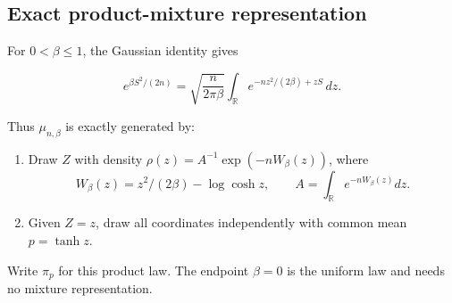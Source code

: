 \subsection{Exact product-mixture representation}\label{cw:exact-product-mixture-representation}

For \(0<\beta\le1\), the Gaussian identity gives

\[
e^{\beta S^2/(2n)}=\sqrt{\frac n{2\pi\beta}}\int_{\mathbb R}
e^{-nz^2/(2\beta)+zS}\,dz.
\]

Thus \(\mu_{n,\beta}\) is exactly generated by:

\begin{enumerate}
\def\labelenumi{\arabic{enumi}.}
\tightlist
\item
  Draw $Z$ with density \(\rho(z)=A^{-1}\exp(-nW_\beta(z))\), where \[
  W_\beta(z)=z^2/(2\beta)-\log\cosh z,
  \qquad A=\int_{\mathbb R} e^{-nW_\beta(z)}dz.
  \]
\item
  Given $Z=z$, draw all coordinates independently with common mean \(p=\tanh z\).
\end{enumerate}

Write \(\pi_p\) for this product law. The endpoint \(\beta=0\) is the uniform law and needs no mixture representation.

